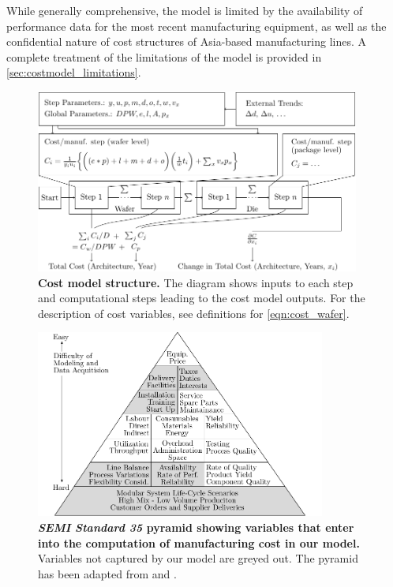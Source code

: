\documentclass[parskip=full]{article}
\begin{document}
While generally comprehensive, the model is limited by the availability of performance data for the most recent manufacturing equipment, as well as the confidential nature of cost structures of Asia-based manufacturing lines. A complete treatment of the limitations of the model is provided in \cref{sec:costmodel_limitations}.

\clearpage

\begin{figure}[H]
    \centering
    \includegraphics[width=0.95\textwidth]{./figures/costmodel.pdf}
    \caption{\textbf{Cost model structure.} The diagram shows inputs to each step and computational steps leading to the cost model outputs. For the description of cost variables, see definitions for \cref{eqn:cost_wafer}.}
    \label{fig:costmodel-schematic}
\end{figure}

\begin{figure}[h!]
    \centering
    \includegraphics[width=0.85\textwidth]{./figures/SEMI_pyramid.pdf}
    \caption{\textbf{\textit{SEMI Standard 35} pyramid showing variables that enter into the computation of manufacturing cost in our model.} Variables not captured by our model are greyed out. The pyramid has been adapted from \cite{standardE35} and \cite{helin200618th}.}
    \label{fig:semi_pyramid}
    \vspace{-20mm}
\end{figure}
\end{document}
